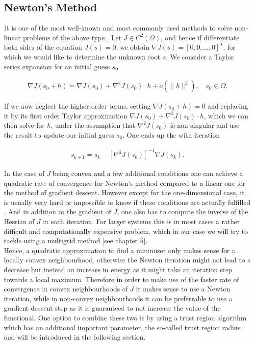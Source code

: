 \documentclass[../draft_1.tex]{subfiles}
\begin{document}
\subsection{Newton's Method}
It is one of the most well-known and most commonly used methods to solve non-linear problems of the above type \cite{briggs2000multigrid}. Let $J \in C^2(\Omega)$, and hence if differentiate both sides of the equation $J(s) = 0$, we obtain $\nabla J(s) =  [0, 0, ..., 0]^T$, for which we would like to determine the unknown root $s$. We consider a Taylor series expansion for an initial guess $s_0$
\begin{ceqn}
\begin{equation}
\begin{aligned}
\nabla J(s_0 + h) = \nabla J(s_0) + \nabla^2 J(s_0) \cdot h + o(\|h\|^2), \quad s_0 \in \Omega.
\end{aligned}
\end{equation}
\end{ceqn}
If we now neglect the higher order terms, setting $\nabla J(s_0+h) = 0$ and replacing it by its first order Taylor approximation $\nabla J(s_0) + \nabla^2 J(s_0) \cdot h$, which we can then solve for $h$, under the assumption that $\nabla^2 J(s_0)$ is non-singular and use the result to update our initial guess $s_0$.  One ends up the with iteration 

\begin{ceqn}
\begin{equation}
\begin{aligned}
s_{k+1} = s_k - [\nabla^2 J(s_k)]^{-1} \nabla J (s_k). 
\end{aligned}
\end{equation}
\end{ceqn}

In the case of $J$ being convex and a few additional conditions one can achieve a quadratic rate of convergence for Newton's method compared to a linear one for the method of gradient descent. However except for the one-dimensional case, it is usually very hard or impossible to know if these conditions are actually fulfilled \cite{deuflhard2011newton}. And in addition to the gradient of $J$, one also has to compute the inverse of the Hessian of $J$ in each iteration. For larger systems this is in most cases a rather difficult and computationally expensive problem, which in our case we will try to tackle using a multigrid method [see chapter 5]. 
\smallskip
\\
Hence, a quadratic approximation to find a minimiser only makes sense for a locally convex neighbourhood, otherwise the Newton iteration might not lead to a decrease but instead an increase in energy as it might take an iteration step towards a local maximum. Therefore in order to make use of the faster rate of convergence in convex neighbourhoods of $J$ it makes sense to use a Newton iteration, while in non-convex neighbourhoods it can be preferrable to use a gradient descent step as it is guaranteed to not increase the value of the functional. One option to combine these two is by using a trust region algorithm which has an additional important parameter, the so-called trust region radius and will be introduced in the following section.
\end{document}
